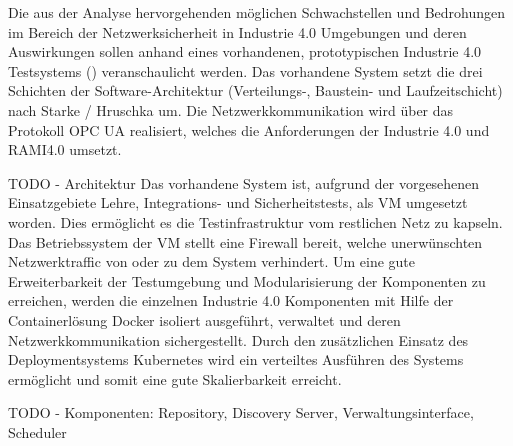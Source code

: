 Die aus der Analyse hervorgehenden möglichen Schwachstellen und Bedrohungen im Bereich der Netzwerksicherheit in Industrie 4.0 Umgebungen und deren Auswirkungen sollen anhand eines vorhandenen, prototypischen Industrie 4.0 Testsystems (\cite{Weber2018}) veranschaulicht werden. Das vorhandene System setzt die drei Schichten der Software-Architektur (Verteilungs-, Baustein- und Laufzeitschicht) nach Starke / Hruschka um. Die Netzwerkkommunikation wird über das Protokoll \ac{OPC UA} realisiert, welches die Anforderungen der Industrie 4.0 und \ac{RAMI4.0} umsetzt.

TODO - Architektur
Das vorhandene System ist, aufgrund der vorgesehenen Einsatzgebiete Lehre, Integrations- und Sicherheitstests, als \ac{VM} umgesetzt worden. Dies ermöglicht es die Testinfrastruktur vom restlichen Netz zu kapseln. Das Betriebssystem der \ac{VM} stellt eine Firewall bereit, welche unerwünschten Netzwerktraffic von oder zu dem System verhindert. Um eine gute Erweiterbarkeit der Testumgebung und Modularisierung der Komponenten zu erreichen, werden die einzelnen Industrie 4.0 Komponenten mit Hilfe der Containerlösung Docker isoliert ausgeführt, verwaltet und deren Netzwerkkommunikation sichergestellt. Durch den zusätzlichen Einsatz des Deploymentsystems Kubernetes wird ein verteiltes Ausführen des Systems ermöglicht und somit eine gute Skalierbarkeit erreicht.

TODO - Komponenten: Repository, Discovery Server, Verwaltungsinterface, Scheduler